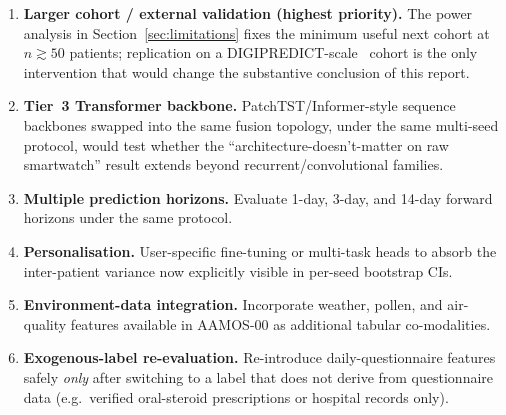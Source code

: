 \documentclass[11pt,a4paper]{article}
\begin{document}
\begin{enumerate}[nosep]
  \item \textbf{Larger cohort / external validation (highest priority).}
        The power analysis in Section~\ref{sec:limitations} fixes the
        minimum useful next cohort at $n\!\gtrsim\!50$ patients;
        replication on a DIGIPREDICT-scale~\cite{chan2024} cohort is
        the only intervention that would change the substantive
        conclusion of this report.
  \item \textbf{Tier~3 Transformer backbone.}  PatchTST/Informer-style
        sequence backbones swapped into the same fusion topology, under
        the same multi-seed protocol, would test whether the
        ``architecture-doesn't-matter on raw smartwatch'' result
        extends beyond recurrent/convolutional families.
  \item \textbf{Multiple prediction horizons.}  Evaluate 1-day, 3-day,
        and 14-day forward horizons under the same protocol.
  \item \textbf{Personalisation.}  User-specific fine-tuning or
        multi-task heads to absorb the inter-patient variance now
        explicitly visible in per-seed bootstrap CIs.
  \item \textbf{Environment-data integration.}  Incorporate weather,
        pollen, and air-quality features available in AAMOS-00 as
        additional tabular co-modalities.
  \item \textbf{Exogenous-label re-evaluation.}  Re-introduce
        daily-questionnaire features safely \emph{only} after switching
        to a label that does not derive from questionnaire data
        (e.g.\ verified oral-steroid prescriptions or hospital records
        only).
\end{enumerate}


\end{document}
